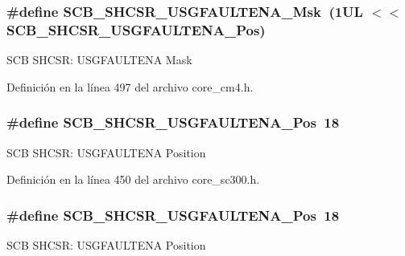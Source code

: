 \subsubsection[{\texorpdfstring{S\+C\+B\+\_\+\+S\+H\+C\+S\+R\+\_\+\+U\+S\+G\+F\+A\+U\+L\+T\+E\+N\+A\+\_\+\+Msk}{SCB_SHCSR_USGFAULTENA_Msk}}]{\setlength{\rightskip}{0pt plus 5cm}\#define S\+C\+B\+\_\+\+S\+H\+C\+S\+R\+\_\+\+U\+S\+G\+F\+A\+U\+L\+T\+E\+N\+A\+\_\+\+Msk~(1\+U\+L $<$$<$ S\+C\+B\+\_\+\+S\+H\+C\+S\+R\+\_\+\+U\+S\+G\+F\+A\+U\+L\+T\+E\+N\+A\+\_\+\+Pos)}\hypertarget{group___c_m_s_i_s___s_c_b_ga056fb6be590857bbc029bed48b21dd79}{}\label{group___c_m_s_i_s___s_c_b_ga056fb6be590857bbc029bed48b21dd79}
S\+CB S\+H\+C\+SR\+: U\+S\+G\+F\+A\+U\+L\+T\+E\+NA Mask 

Definición en la línea 497 del archivo core\+\_\+cm4.\+h.

\subsubsection[{\texorpdfstring{S\+C\+B\+\_\+\+S\+H\+C\+S\+R\+\_\+\+U\+S\+G\+F\+A\+U\+L\+T\+E\+N\+A\+\_\+\+Pos}{SCB_SHCSR_USGFAULTENA_Pos}}]{\setlength{\rightskip}{0pt plus 5cm}\#define S\+C\+B\+\_\+\+S\+H\+C\+S\+R\+\_\+\+U\+S\+G\+F\+A\+U\+L\+T\+E\+N\+A\+\_\+\+Pos~18}\hypertarget{group___c_m_s_i_s___s_c_b_gae71949507636fda388ec11d5c2d30b52}{}\label{group___c_m_s_i_s___s_c_b_gae71949507636fda388ec11d5c2d30b52}
S\+CB S\+H\+C\+SR\+: U\+S\+G\+F\+A\+U\+L\+T\+E\+NA Position 

Definición en la línea 450 del archivo core\+\_\+sc300.\+h.

\subsubsection[{\texorpdfstring{S\+C\+B\+\_\+\+S\+H\+C\+S\+R\+\_\+\+U\+S\+G\+F\+A\+U\+L\+T\+E\+N\+A\+\_\+\+Pos}{SCB_SHCSR_USGFAULTENA_Pos}}]{\setlength{\rightskip}{0pt plus 5cm}\#define S\+C\+B\+\_\+\+S\+H\+C\+S\+R\+\_\+\+U\+S\+G\+F\+A\+U\+L\+T\+E\+N\+A\+\_\+\+Pos~18}\hypertarget{group___c_m_s_i_s___s_c_b_gae71949507636fda388ec11d5c2d30b52}{}\label{group___c_m_s_i_s___s_c_b_gae71949507636fda388ec11d5c2d30b52}
S\+CB S\+H\+C\+SR\+: U\+S\+G\+F\+A\+U\+L\+T\+E\+NA Position 


